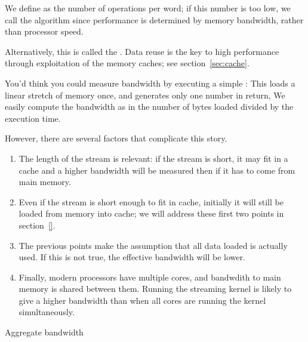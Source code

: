 We define  as the number
of operations per word;
if this number is too low, we call the algorithm
 since performance is determined
by memory bandwidth, rather than processor speed.

Alternatively, this is called the .
Data reuse is the key to high performance through exploitation
of the memory caches; see section~\ref{sec:cache}.

You'd think you could measure bandwidth by executing
a simple :
%
%
This loads a linear stretch of memory once, and generates
only one number in return,
We easily compute the bandwidth as in the number of bytes loaded
divided by the execution time.

However, there are several factors that complicate this story.
\begin{enumerate}
\item The length of the stream is relevant: if the stream is short,
  it may fit in a cache and a higher bandwidth will be measured
  then if it has to come from main memory.
\item  Even if the stream is short enough to fit in cache,
  initially it will still be loaded from memory into cache;
  we will address these first two points in section~\ref{}.
\item The previous points make the assumption that all data loaded
  is actually used. If this is not true, the effective bandwidth will be lower.
\item Finally, modern processors have multiple cores,
  and bandwdith to main memory is shared between them.
  Running the streaming kernel is likely to give a higher bandwidth
  than when all cores are running the kernel simultaneously.
\end{enumerate}

 {Aggregate bandwidth}

